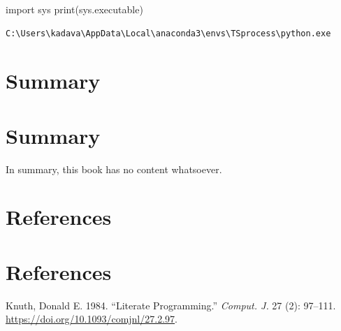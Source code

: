 \documentclass[
  letterpaper,
  DIV=11,
  numbers=noendperiod]{scrreprt}
\newenvironment{Shaded}{\begin{snugshade}}{\end{snugshade}}
\newcommand{\BuiltInTok}[1]{\textcolor[rgb]{0.00,0.23,0.31}{#1}}
\newcommand{\ImportTok}[1]{\textcolor[rgb]{0.00,0.46,0.62}{#1}}
\newcommand{\NormalTok}[1]{\textcolor[rgb]{0.00,0.23,0.31}{#1}}
\newlength{\cslhangindent}
\newenvironment{CSLReferences}[2] %
 {\begin{list}{}{%
  \setlength{\itemindent}{0pt}
  \setlength{\leftmargin}{0pt}
  \setlength{\parsep}{0pt}
  \ifodd #1
   \setlength{\leftmargin}{\cslhangindent}
   \setlength{\itemindent}{-1\cslhangindent}
  \fi
  \setlength{\itemsep}{#2\baselineskip}}}
 {\end{list}}
\begin{document}
\begin{Shaded}
\begin{Highlighting}[]
\ImportTok{import}\NormalTok{ sys}
\BuiltInTok{print}\NormalTok{(sys.executable)}
\end{Highlighting}
\end{Shaded}

\begin{verbatim}
C:\Users\kadava\AppData\Local\anaconda3\envs\TSprocess\python.exe
\end{verbatim}


\chapter{Summary}\label{summary}


\chapter{Summary}\label{summary-1}

In summary, this book has no content whatsoever.


\chapter{References}\label{references}


\chapter*{References}\label{references-1}


\label{refs}
\begin{CSLReferences}{1}{0}
Knuth, Donald E. 1984. {``Literate Programming.''} \emph{Comput. J.} 27
(2): 97--111. \url{https://doi.org/10.1093/comjnl/27.2.97}.

\end{CSLReferences}
\end{document}

